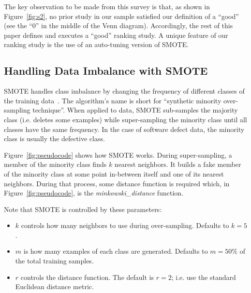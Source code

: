 \documentclass[10pt,conference]{IEEEtran}
\newcommand{\bi}{\begin{itemize}[leftmargin=0.4cm]}
\newcommand{\ei}{\end{itemize}}
\theoremstyle{break}
\theoremstyle{break}
\begin{document}
The key   observation to be made from  this 
survey is that, as shown in Figure~\ref{fig:s2}, no prior study in our sample satisfied  our definition of a ``good'' (see the ``0'' in the middle of the Venn diagram).
Accordingly, the rest of this
paper defines and executes a ``good'' ranking  study. A unique feature of our
ranking study is the use of an auto-tuning version of SMOTE.
 
 
\subsection{Handling Data Imbalance with SMOTE}
\label{sect:smote}

SMOTE handles class imbalance by changing the frequency of different classes of the training
data~\cite{chawla2002smote}. 
The algorithm's name is short for ``synthetic minority over-sampling technique''.
When applied to data, SMOTE sub-samples the majority class (i.e. deletes some examples)
while super-sampling the minority class
until
all classes have the same frequency.  In the case of software defect data,
the minority class is usually the  defective class.



Figure~\ref{fig:pseudocode} shows how SMOTE works. During super-sampling,
a member of the minority class finds $k$ nearest neighbors. It builds a fake member
of the minority class at some point in-between itself and one of its nearest
neighbors.  During that process, some distance function is required which, in Figure~\ref{fig:pseudocode}, is the {\em minkowski\_distance} function. 

\noindent
Note that SMOTE is controlled by these  parameters:
\bi
\item $k$ controls how many neighbors to use during over-sampling. Defaults to $k=5$.
\item $m$ is how many examples of each class are generated. Defaults to $m=50\%$ of the total training samples.
\item $r$ controls the distance function. The default is $r=2$;
i.e. use the  
standard Euclidean distance metric.
\ei
\end{document}
